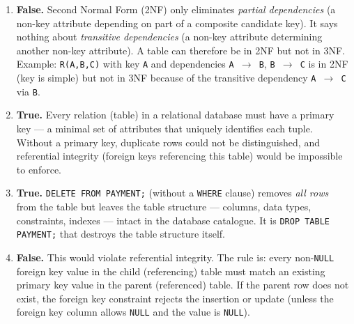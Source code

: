 \documentclass[11pt]{article}
\newcommand{\cle}[1]{{\popxbold\color{popdark}#1}}
\begin{document}
\begin{corrige}
\begin{enumerate}
\item \textbf{False.} Second Normal Form (2NF) only eliminates \emph{partial dependencies} (a non-key attribute depending on part of a composite candidate key). It says nothing about \emph{transitive dependencies} (a non-key attribute determining another non-key attribute). A table can therefore be in 2NF but not in 3NF. Example: \texttt{R(A,B,C)} with key \texttt{A} and dependencies \texttt{A $\rightarrow$ B}, \texttt{B $\rightarrow$ C} is in 2NF (key is simple) but not in 3NF because of the transitive dependency \texttt{A $\rightarrow$ C} via \texttt{B}.
\item \textbf{True.} Every relation (table) in a relational database must have a primary key — a minimal set of attributes that uniquely identifies each tuple. Without a primary key, duplicate rows could not be distinguished, and referential integrity (foreign keys referencing this table) would be impossible to enforce.
\item \textbf{True.} \texttt{DELETE FROM PAYMENT;} (without a \texttt{WHERE} clause) removes \emph{all rows} from the table but leaves the table structure — columns, data types, constraints, indexes — intact in the database catalogue. It is \texttt{DROP TABLE PAYMENT;} that destroys the table structure itself.
\item \textbf{False.} This would violate \cle{referential integrity}. The rule is: every non-\texttt{NULL} foreign key value in the child (referencing) table must match an existing primary key value in the parent (referenced) table. If the parent row does not exist, the foreign key constraint rejects the insertion or update (unless the foreign key column allows \texttt{NULL} and the value is \texttt{NULL}).
\end{enumerate}
\end{corrige}
\end{document}
